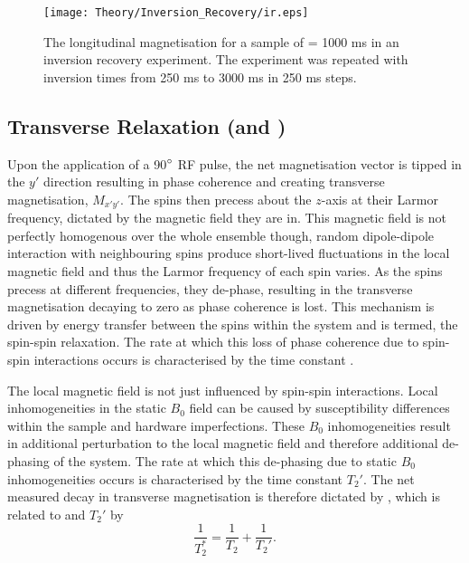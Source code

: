 \begin{figure}[H]
	\centering
	\texttt{[image: Theory/Inversion\_Recovery/ir.eps]}
	\caption{The longitudinal magnetisation for a sample of \tone = 1000 ms in an inversion recovery experiment. The experiment was repeated with inversion times from 250 ms to 3000 ms in 250 ms steps.}
	\label{fig:theory_inversion_recovery}	
\end{figure}
\subsection{Transverse Relaxation (\ttwo and \ttwostar)}
\label{subsec:theory_t2}
Upon the application of a 90$\degree$ \ac{RF} pulse, the net magnetisation vector is tipped in the $y'$ direction resulting in phase coherence and creating transverse magnetisation, $M_{x'y'}$. The spins then precess about the $z$-axis at their Larmor frequency, dictated by the magnetic field they are in. This magnetic field is not perfectly homogenous over the whole ensemble though, random dipole-dipole interaction with neighbouring spins produce short-lived fluctuations in the local magnetic field and thus the Larmor frequency of each spin varies. As the spins precess at different frequencies, they de-phase, resulting in the transverse magnetisation decaying to zero as phase coherence is lost. This mechanism is driven by energy transfer between the spins within the system and is termed, the spin-spin relaxation. The rate at which this loss of phase coherence due to spin-spin interactions occurs is characterised by the time constant \ttwo.

The local magnetic field is not just influenced by spin-spin interactions. Local inhomogeneities in the static $B_0$ field can be caused by susceptibility differences within the sample and hardware imperfections. These $B_0$  inhomogeneities result in additional perturbation to the local magnetic field and therefore additional de-phasing of the system. The rate at which this de-phasing due to static $B_0$ inhomogeneities occurs is characterised by the time constant $T_2'$. The net measured decay in transverse magnetisation is therefore dictated by \ttwostar, which is related to \ttwo and $T_2'$ by
\begin{equation}
\frac{1}{T_2^*} = \frac{1}{T_2} + \frac{1}{T_2'}.
\end{equation}
